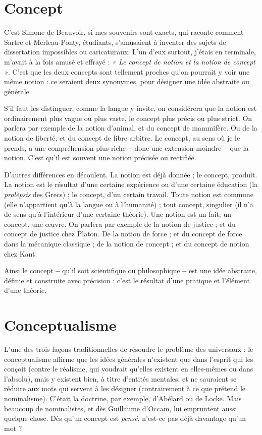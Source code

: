 \section{Concept}
C'est Simone de Beauvoir, si mes souvenirs sont exacts, qui
raconte comment Sartre et Merleau-Ponty, étudiants, s’amusaient
à inventer des sujets de dissertation impossibles ou caricaturaux. L'un
d'eux surtout, j'étais en terminale, m'avait à la fois amusé et effrayé : {\it « Le
concept de notion et la notion de concept »}. C’est que les deux concepts sont tellement
proches qu’on pourrait y voir une même notion : ce seraient deux synonymes,
pour désigner une idée abstraite ou générale.

S’il faut les distinguer, comme la langue y invite, on considérera que la
notion est ordinairement plus vague ou plus vaste, le concept plus précis ou
plus strict. On parlera par exemple de la notion d’animal, et du concept de
mammifère. Ou de la notion de liberté, et du concept de libre arbitre. Le
concept, au sens où je le prends, a une compréhension plus riche {\bf --} donc une
extension moindre {\bf --} que la notion. C’est qu’il est souvent une notion précisée
ou rectifiée.

D’autres différences en découlent. La notion est déjà donnée ; le concept,
produit. La notion est le résultat d’une certaine expérience ou d’une certaine
éducation (la {\it prolèpsis} des Grecs) ; le concept, d’un certain travail. Toute
notion est commune (elle n'appartient qu’à la langue ou à l'humanité) ; tout
concept, singulier (il n’a de sens qu’à l’intérieur d’une certaine théorie). Une
notion est un fait; un concept, une œuvre. On parlera par exemple de la
notion de justice ; et du concept de justice chez Platon. De la notion de force ;
et du concept de force dans la mécanique classique ; de la notion de concept ;
et du concept de notion chez Kant.

Ainsi le concept {\bf --} qu’il soit scientifique ou philosophique {\bf --} est une idée
abstraite, définie et construite avec précision : c’est le résultat d’une pratique et
l'élément d’une théorie.

\section{Conceptualisme}
L’une des trois façons traditionnelles de résoudre le
problème des universaux : le conceptualisme affirme
que les idées générales n'existent que dans l’esprit qui les conçoit (contre le réalisme,
qui voudrait qu’elles existent en elles-mêmes ou dans l'absolu), mais y
existent bien, à titre d’entités mentales, et ne sauraient se réduire aux mots qui
servent à les désigner (contrairement à ce que prétend le nominalisme). C'était
la doctrine, par exemple, d’Abélard ou de Locke. Mais beaucoup de nominalistes,
et dès Guillaume d’Occam, lui empruntent aussi quelque chose. Dès
qu’un concept est {\it pensé}, n’est-ce pas déjà davantage qu’un mot ?

